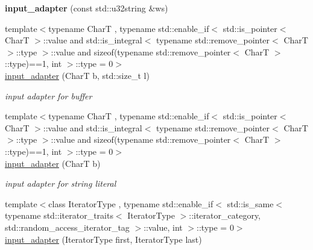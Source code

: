 \begin{DoxyCompactItemize}
{\bfseries input\+\_\+adapter} (const std\+::u32string \&ws)
\item 
\mbox{\label{classnlohmann_1_1detail_1_1input__adapter_a37816622d79ab4a1a76f4d7e872b65e1}} 
{\footnotesize template$<$typename CharT , typename std\+::enable\+\_\+if$<$ std\+::is\+\_\+pointer$<$ Char\+T $>$\+::value and std\+::is\+\_\+integral$<$ typename std\+::remove\+\_\+pointer$<$ Char\+T $>$\+::type $>$\+::value and sizeof(typename std\+::remove\+\_\+pointer$<$ Char\+T $>$\+::type)==1, int $>$\+::type  = 0$>$ }\\\mbox{\hyperlink{classnlohmann_1_1detail_1_1input__adapter_a37816622d79ab4a1a76f4d7e872b65e1}{input\+\_\+adapter}} (CharT b, std\+::size\+\_\+t l)
\begin{DoxyCompactList}\small\item\em input adapter for buffer \end{DoxyCompactList}\item 
\mbox{\label{classnlohmann_1_1detail_1_1input__adapter_a86f035d9c4319360014b922b5e433ced}} 
{\footnotesize template$<$typename CharT , typename std\+::enable\+\_\+if$<$ std\+::is\+\_\+pointer$<$ Char\+T $>$\+::value and std\+::is\+\_\+integral$<$ typename std\+::remove\+\_\+pointer$<$ Char\+T $>$\+::type $>$\+::value and sizeof(typename std\+::remove\+\_\+pointer$<$ Char\+T $>$\+::type)==1, int $>$\+::type  = 0$>$ }\\\mbox{\hyperlink{classnlohmann_1_1detail_1_1input__adapter_a86f035d9c4319360014b922b5e433ced}{input\+\_\+adapter}} (CharT b)
\begin{DoxyCompactList}\small\item\em input adapter for string literal \end{DoxyCompactList}\item 
\mbox{\label{classnlohmann_1_1detail_1_1input__adapter_ad6824b0f792691f75186c527fa31a6b4}} 
{\footnotesize template$<$class Iterator\+Type , typename std\+::enable\+\_\+if$<$ std\+::is\+\_\+same$<$ typename std\+::iterator\+\_\+traits$<$ Iterator\+Type $>$\+::iterator\+\_\+category, std\+::random\+\_\+access\+\_\+iterator\+\_\+tag $>$\+::value, int $>$\+::type  = 0$>$ }\\\mbox{\hyperlink{classnlohmann_1_1detail_1_1input__adapter_ad6824b0f792691f75186c527fa31a6b4}{input\+\_\+adapter}} (Iterator\+Type first, Iterator\+Type last)

\end{DoxyCompactItemize}
